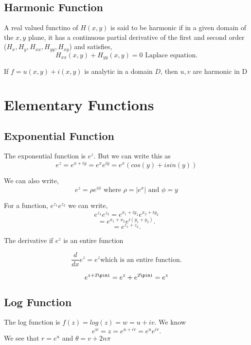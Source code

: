 
\section*{Harmonic Function}

\begin{definition}
   A real valued functino of $H(x,y)$ is said to be harmonic if in a given domain of the $x,y$ plane, it has a continuous partial derivative of the first and second order ($H_x,H_y,H_{xx},H_{yy},H_{xy}$) and satisfies,  \[
      H_{xx}(x,y)  + H_{yy}(x,y) = 0 \text{ Laplace equation}
   .\] 

\end{definition}     


\begin{theorem}
   If $f = u(x,y) + i(x,y)$ is analytic in a domain $D$, then $u,v$ are harmonic in D
\end{theorem}




\chapter*{Elementary Functions}
\section*{Exponential Function}
The exponential function is $e^z$. But we can write this as 
$$e^z = e^{x + iy} = e^x e^{iy} = e^x(cos(y) + isin(y))$$

We can also write, $$e^z = \rho e^{i \phi} \text{ where } \rho = |e^x| \text{ and } \phi = y$$ 

For a function, $e^{z_1}e^{z_2}$ we can write, 
$$e^{z_1}e^{z_2} = e^{x_1 + iy_1}e^{x_2+iy_2}$$
\[
=e^{x_1 + x_2} e^{i(y_1+y_2)}
.\] 
\[
   =e^{z_1+z_2}
.\] 



The derivative if $e^z$ is an entire function

$$\frac{d}{dx} e^z = e^z \text{which is an entire function.}$$

$$e^{z + 2\pini} = e^z + e^{2\pini} = e^z$$

\section*{Log Function}
The log function is $f(z) = log(z) = w = u + iv$. We know \[
   e^w = z = e^{u + iv} = e^u e^{iv}
.\] 
We see that $r = e^u$ and $\theta = v + 2n\pi$

